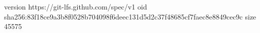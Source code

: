version https://git-lfs.github.com/spec/v1
oid sha256:83f18ce9a3b8f0528b704098f6deec131d5d2c37f48685cf7faec8e8849cec9c
size 45575
